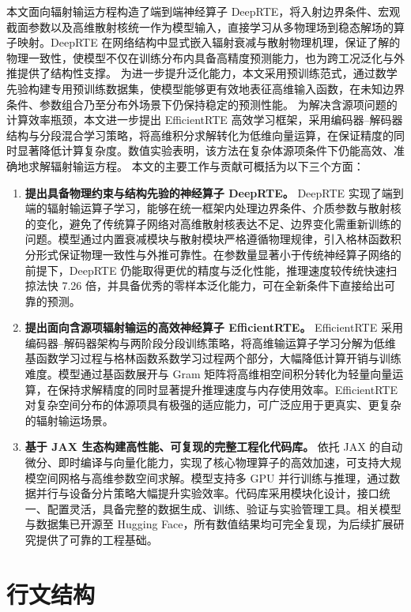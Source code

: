 本文面向辐射输运方程构造了端到端神经算子 DeepRTE，将入射边界条件、宏观截面参数以及高维散射核统一作为模型输入，直接学习从多物理场到稳态解场的算子映射。DeepRTE 在网络结构中显式嵌入辐射衰减与散射物理机理，保证了解的物理一致性，使模型不仅在训练分布内具备高精度预测能力，也为跨工况泛化与外推提供了结构性支撑。
为进一步提升泛化能力，本文采用预训练范式，通过数学先验构建专用预训练数据集，使模型能够更有效地表征高维输入函数，在未知边界条件、参数组合乃至分布外场景下仍保持稳定的预测性能。
为解决含源项问题的计算效率瓶颈，本文进一步提出 EfficientRTE 高效学习框架，采用编码器–解码器结构与分段混合学习策略，将高维积分求解转化为低维向量运算，在保证精度的同时显著降低计算复杂度。数值实验表明，该方法在复杂体源项条件下仍能高效、准确地求解辐射输运方程。
本文的主要工作与贡献可概括为以下三个方面：
\begin {enumerate}
\item \textbf {提出具备物理约束与结构先验的神经算子 DeepRTE。}
DeepRTE 实现了端到端的辐射输运算子学习，能够在统一框架内处理边界条件、介质参数与散射核的变化，避免了传统算子网络对高维散射核表达不足、边界变化需重新训练的问题。模型通过内置衰减模块与散射模块严格遵循物理规律，引入格林函数积分形式保证物理一致性与外推可靠性。在参数量显著小于传统神经算子网络的前提下，DeepRTE 仍能取得更优的精度与泛化性能，推理速度较传统快速扫掠法快 7.26 倍，并具备优秀的零样本泛化能力，可在全新条件下直接给出可靠的预测。
\item \textbf {提出面向含源项辐射输运的高效神经算子 EfficientRTE。}
EfficientRTE 采用编码器–解码器架构与两阶段分段训练策略，将高维输运算子学习分解为低维基函数学习过程与格林函数系数学习过程两个部分，大幅降低计算开销与训练难度。模型通过基函数展开与 Gram 矩阵将高维相空间积分转化为轻量向量运算，在保持求解精度的同时显著提升推理速度与内存使用效率。EfficientRTE 对复杂空间分布的体源项具有极强的适应能力，可广泛应用于更真实、更复杂的辐射输运场景。
\item \textbf {基于 JAX 生态构建高性能、可复现的完整工程化代码库。}
依托 JAX 的自动微分、即时编译与向量化能力，实现了核心物理算子的高效加速，可支持大规模空间网格与高维参数空间求解。模型支持多 GPU 并行训练与推理，通过数据并行与设备分片策略大幅提升实验效率。代码库采用模块化设计，接口统一、配置灵活，具备完整的数据生成、训练、验证与实验管理工具。相关模型与数据集已开源至 Hugging Face，所有数值结果均可完全复现，为后续扩展研究提供了可靠的工程基础。
\end {enumerate}

\section{行文结构}

